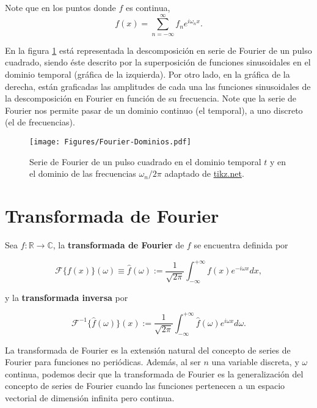 Note que en los puntos donde $f$ es continua,
\begin{equation}
    f(x) = \sum_{n = - \infty}^{\infty} f_n e^{i \omega_n x}.
\end{equation}

En la figura \ref{fig:Fourier-Domains} está representada la descomposición en serie de Fourier de un pulso cuadrado, siendo éste descrito por la superposición de funciones sinusoidales en el dominio temporal (gráfica de la izquierda). Por otro lado, en la gráfica de la derecha, están graficadas las amplitudes de cada una las funciones sinusoidales de la descomposición en Fourier en función de su frecuencia. Note que la serie de Fourier nos permite pasar de un dominio continuo (el temporal), a uno discreto (el de frecuencias).

\begin{figure}
    \centering
    \texttt{[image: Figures/Fourier-Dominios.pdf]}
    \caption{Serie de Fourier de un pulso cuadrado en el dominio temporal $t$ y en el dominio de las frecuencias $\omega_{n}/2\pi$ adaptado de \href{https://tikz.net/fourier_series/}{tikz.net}.}
    \label{fig:Fourier-Domains}
\end{figure}

\section{Transformada de Fourier}

Sea $f:\mathbb{R} \rightarrow \mathbb{C}$, la \textbf{transformada de Fourier} de $f$ se encuentra definida por
\begin{shaded}
\begin{equation}
    \mathcal{F}\{f(x)\}(\omega) \equiv \hat{f}(\omega) := \frac{1}{\sqrt{2\pi}} \int_{-\infty}^{+\infty} f(x) e^{-i\omega x} dx, \label{eq:Fourier-Trans}
\end{equation}    
\end{shaded}
\noindent y la \textbf{transformada inversa} por 
\begin{shaded}
\begin{equation}
 \mathcal{F}^{-1}\{\hat{f}(\omega)\} (x) := \frac{1}{\sqrt{2\pi}} \int_{-\infty}^{+\infty} \hat{f}(\omega) e^{i\omega x} d\omega.   \label{eq:Fourier-Inv}
\end{equation}    
\end{shaded}

La transformada de Fourier es la extensión natural del concepto de series de Fourier para funciones no periódicas. Además, al ser $n$ una variable discreta, y $\omega$ continua, podemos decir que la transformada de Fourier es la generalización del concepto de series de Fourier cuando las funciones pertenecen a un espacio vectorial de dimensión infinita pero continua.


